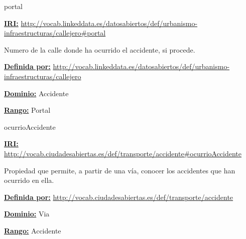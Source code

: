 \begin{mybox}{portal}
\begin{flushleft}
\underline{\textbf{IRI:}}
\url{http://vocab.linkeddata.es/datosabiertos/def/urbanismo-infraestructuras/callejero#portal}
\newline

Numero de la calle donde ha ocurrido el accidente, si procede.
\newline

\underline{\textbf{Definida por:}}\newline
\url{http://vocab.linkeddata.es/datosabiertos/def/urbanismo-infraestructuras/callejero}
\newline

\underline{\textbf{Dominio:}} Accidente
\newline

\underline{\textbf{Rango:}} Portal
\newline

\end{flushleft}
\end{mybox}








\begin{mybox}{ocurrioAccidente}
\begin{flushleft}
\underline{\textbf{IRI:}}
\url{http://vocab.ciudadesabiertas.es/def/transporte/accidente#ocurrioAccidente}
\newline

Propiedad que permite, a partir de una vía, conocer los accidentes que han ocurrido en ella.

\underline{\textbf{Definida por:}}\newline
\url{http://vocab.ciudadesabiertas.es/def/transporte/accidente}
\newline

\underline{\textbf{Dominio:}} Via
\newline

\underline{\textbf{Rango:}} Accidente
\newline

\end{flushleft}
\end{mybox}




